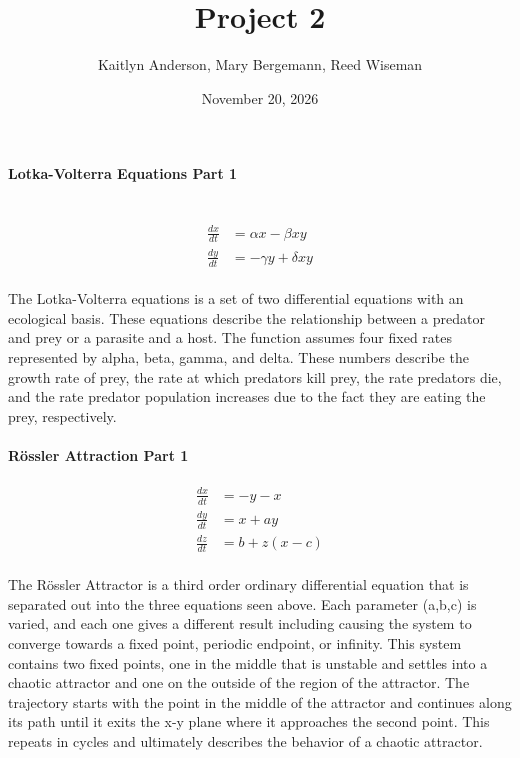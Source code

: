 \documentclass[11pt]{article}
\title{Project 2}
\author{Kaitlyn Anderson, Mary Bergemann, Reed Wiseman}
\date{November 20, 2026}
\begin{document}
\sloppy
\maketitle

\paragraph{Lotka-Volterra Equations Part 1}\\
\begin{align*}
    \frac{dx}{dt} &= \alpha x-\beta xy\\
    \frac{dy}{dt} &= -\gamma y+\delta xy
\end{align*}\\
The Lotka-Volterra equations is a set of two differential equations with an ecological basis. These equations describe the relationship between a predator and prey or a parasite and a host. The function assumes four fixed rates represented by alpha, beta, gamma, and delta. These numbers describe the growth rate of prey, the rate at which predators kill prey, the rate predators die, and the rate predator population increases due to the fact they are eating the prey, respectively. 

\paragraph{Rössler Attraction Part 1}
\begin{align*}
    \frac{dx}{dt} &= -y-x\\
    \frac{dy}{dt} &= x+ay\\
    \frac{dz}{dt} &= b +z(x-c)\\
\end{align*}

The Rössler Attractor is a third order ordinary differential equation that is separated out into the three equations seen above. Each parameter (a,b,c) is varied, and each one gives a different result including causing the system to converge towards a fixed point, periodic endpoint, or infinity. This system contains two fixed points, one in the middle that is unstable and settles into a chaotic attractor and one on the outside of the region of the attractor. The trajectory starts with the point in the middle of the attractor and continues along its path until it exits the x-y plane where it approaches the second point. This repeats in cycles and ultimately describes the behavior of a chaotic attractor. 
\end{document}
